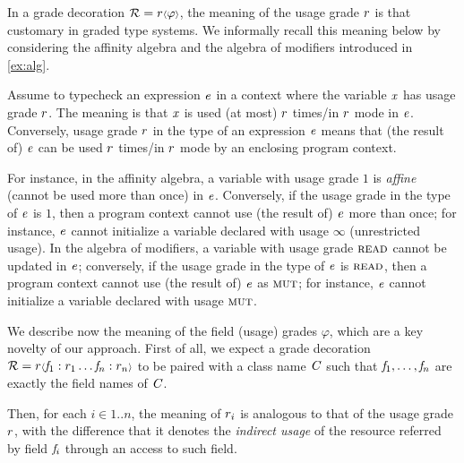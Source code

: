 In a grade decoration  $\mathcal{R}=r{\scriptstyle\langle}\varphi{\scriptstyle\rangle}$, the meaning of the usage grade $r$ is that customary in graded type systems.
We informally recall this meaning  below by considering the affinity algebra and the algebra of modifiers introduced in \cref{ex:alg}. 

Assume to typecheck an expression $\mathit{e}$ in a context where the variable $\mathit{x}$ has usage grade $r$. The meaning is that $\mathit{x}$ is used (at most) $r$ times/in $r$ mode in $\mathit{e}$. Conversely, usage grade $r$ in the type of an expression $\mathit{e}$ means that (the result of) $\mathit{e}$ can be used $r$ times/in $r$ mode by an enclosing program context.

For instance, in the affinity algebra, a variable with usage grade $1$ is \emph{affine} (cannot be used more than once) in $\mathit{e}$. Conversely, if the usage grade in the type of $\mathit{e}$ is $1$, 
then a program context cannot use (the result of) $\mathit{e}$ more than once; for instance, $\mathit{e}$ cannot initialize a variable declared with usage $\infty$ (unrestricted usage). 
In the algebra of modifiers, a variable with usage grade $\textsc{read}$ cannot be updated in $\mathit{e}$; conversely, if the usage grade in the type of $\mathit{e}$ is $\textsc{read}$,  then a program context cannot use (the result of) $\mathit{e}$ as $\textsc{mut}$; for instance, $\mathit{e}$ cannot initialize a variable declared with usage $\textsc{mut}$. 

We describe now the meaning of the field (usage) grades $\varphi$, which are a key novelty of our approach. First of all, we expect a grade decoration $\mathcal{R}=r{\scriptstyle\langle}\mathit{f}_1:r_1\ldots\mathit{f}_n:r_n{\scriptstyle\rangle}$ to be paired with a class name $\mathit{C}$ such that $\mathit{f}_1, \ldots, \mathit{f}_n$ are exactly the field names of $\mathit{C}$. 

Then, for each $i\in 1..n$, the meaning of $r_i$ is analogous to that of the usage grade $r$, with the difference that it denotes the \emph{indirect usage} of the resource referred by field $\mathit{f}_i$ through an access to such field. 

